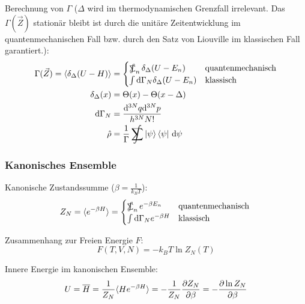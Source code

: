 			\noindent
			Berechnung von $\Gamma$ ($\Delta$ wird im thermodynamischen Grenzfall irrelevant. Das $\Gamma(\vec{Z})$ stationär bleibt ist durch die unitäre Zeitentwicklung im quantenmechanischen Fall bzw. durch den Satz von Liouville im klassischen Fall garantiert.):
			\begin{equation}
				\begin{aligned}
					\Gamma(\vec{Z}) = \langle \delta_\Delta (U-H) \rangle
						&= \begin{cases}
								\SumInt_n \delta_\Delta(U-E_n) & \text{quantenmechanisch} \\
								\int \diff \Gamma_N \delta_\Delta(U-E_n) & \text{klassisch}
							\end{cases} \\
					\delta_\Delta(x) &= \Theta(x) - \Theta(x-\Delta)\\
					\diff \Gamma_N &= \frac{\diff^{3N}q \diff^{3N}p }{h^{3N} N!} \\
					\hat{\rho} &= \frac{1}{\Gamma} \SumInt \Ket{\psi}\Bra{\psi}\,\diff\psi
				\end{aligned}
			\end{equation}

		\subsubsection{Kanonisches Ensemble}
			\noindent
			Kanonische Zustandssumme ($\beta = \frac{1}{k_B T}$):
			\begin{equation}
				Z_N=\langle e^{-\beta H} \rangle
					= \begin{cases}
							\SumInt_n e^{-\beta E_n} & \text{quantenmechanisch} \\
							\int \diff \Gamma_N e^{-\beta H} & \text{klassisch}
						\end{cases} \\
			\end{equation}

			\noindent
			Zusammenhang zur Freien Energie $F$:
			\begin{equation}
				F(T, V, N) = -k_B T \ln{Z_N(T)}
			\end{equation}


			\noindent
			Innere Energie im kanonischen Ensemble:
			\begin{equation}
				U = \overline{H} = \frac{1}{Z_N}\langle He^{-\beta H}\rangle = -\frac{1}{Z_N}\frac{\partial Z_N}{\partial \beta} = -\frac{\partial \ln Z_N}{\partial \beta}
			\end{equation}

